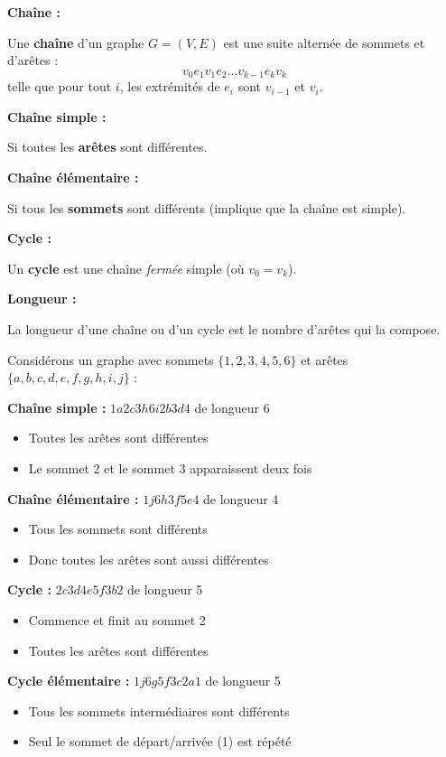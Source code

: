 \documentclass[12pt,a4paper]{article}
\begin{document}
\begin{definition}
\textbf{Chaîne :}

Une \textcolor{titrebleu}{\textbf{chaîne}} d'un graphe $G = (V, E)$ est une suite alternée de sommets et d'arêtes :
$$v_0 e_1 v_1 e_2 \ldots v_{k-1} e_k v_k$$
telle que pour tout $i$, les extrémités de $e_i$ sont $v_{i-1}$ et $v_i$.

\textbf{Chaîne simple :}

Si toutes les \textcolor{defvert}{\textbf{arêtes}} sont différentes.

\textbf{Chaîne élémentaire :}

Si tous les \textcolor{algoviolet}{\textbf{sommets}} sont différents (implique que la chaîne est simple).

\textbf{Cycle :}

Un \textcolor{exempleorange}{\textbf{cycle}} est une chaîne \textit{fermée} simple (où $v_0 = v_k$).

\textbf{Longueur :}

La longueur d'une chaîne ou d'un cycle est le nombre d'arêtes qui la compose.
\end{definition}

\begin{exemple}
Considérons un graphe avec sommets $\{1, 2, 3, 4, 5, 6\}$ et arêtes $\{a, b, c, d, e, f, g, h, i, j\}$ :

\textbf{Chaîne simple :} $1a2c3h6i2b3d4$ de longueur 6
\begin{itemize}
    \item Toutes les arêtes sont différentes
    \item Le sommet 2 et le sommet 3 apparaissent deux fois
\end{itemize}

\textbf{Chaîne élémentaire :} $1j6h3f5e4$ de longueur 4
\begin{itemize}
    \item Tous les sommets sont différents
    \item Donc toutes les arêtes sont aussi différentes
\end{itemize}

\textbf{Cycle :} $2c3d4e5f3b2$ de longueur 5
\begin{itemize}
    \item Commence et finit au sommet 2
    \item Toutes les arêtes sont différentes
\end{itemize}

\textbf{Cycle élémentaire :} $1j6g5f3c2a1$ de longueur 5
\begin{itemize}
    \item Tous les sommets intermédiaires sont différents
    \item Seul le sommet de départ/arrivée (1) est répété
\end{itemize}
\end{exemple}
\end{document}
